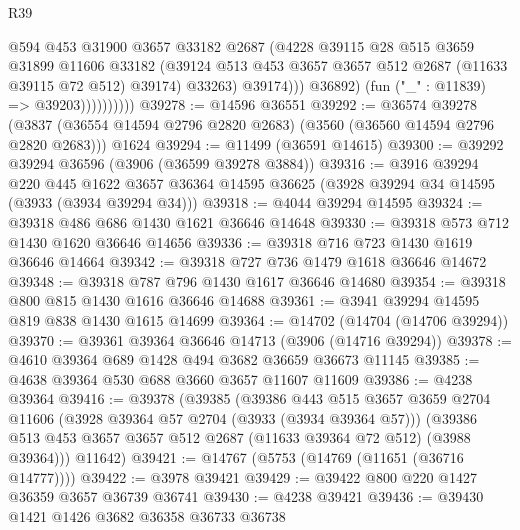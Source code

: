\begin{lexlean}{R39}
\begin{coremodule}
                              @594
                              @453
                              @31900
                              @3657
                              @33182
                              @2687
                              (@4228
                                @39115
                                @28
                                @515
                                @3659
                                @31899
                                @11606
                                @33182
                                (@39124
                                  @513
                                  @453
                                  @3657
                                  @3657
                                  @512
                                  @2687
                                  (@11633 @39115 @72 @512)
                                  @39174)
                                @33263)
                              @39174)))
                        @36892)
                      (fun ("_" : @11839) => @39203))))))))))
@39278 := @14596 @36551
@39292 := @36574
    @39278
    (@3837 (@36554 @14594 @2796 @2820 @2683) (@3560 (@36560 @14594 @2796 @2820 @2683)))
    @1624
@39294 := @11499 (@36591 @14615)
@39300 := @39292 @39294 @36596 (@3906 (@36599 @39278 @3884))
@39316 := @3916
    @39294
    @220
    @445
    @1622
    @3657
    @36364
    @14595
    @36625
    (@3928 @39294 @34 @14595 (@3933 (@3934 @39294 @34)))
@39318 := @4044 @39294 @14595
@39324 := @39318 @486 @686 @1430 @1621 @36646 @14648
@39330 := @39318 @573 @712 @1430 @1620 @36646 @14656
@39336 := @39318 @716 @723 @1430 @1619 @36646 @14664
@39342 := @39318 @727 @736 @1479 @1618 @36646 @14672
@39348 := @39318 @787 @796 @1430 @1617 @36646 @14680
@39354 := @39318 @800 @815 @1430 @1616 @36646 @14688
@39361 := @3941 @39294 @14595 @819 @838 @1430 @1615 @14699
@39364 := @14702 (@14704 (@14706 @39294))
@39370 := @39361 @39364 @36646 @14713 (@3906 (@14716 @39294))
@39378 := @4610 @39364 @689 @1428 @494 @3682 @36659 @36673 @11145
@39385 := @4638 @39364 @530 @688 @3660 @3657 @11607 @11609
@39386 := @4238 @39364
@39416 := @39378
    (@39385
      (@39386
        @443
        @515
        @3657
        @3659
        @2704
        @11606
        (@3928 @39364 @57 @2704 (@3933 (@3934 @39364 @57)))
        (@39386 @513 @453 @3657 @3657 @512 @2687 (@11633 @39364 @72 @512) (@3988 @39364)))
      @11642)
@39421 := @14767 (@5753 (@14769 (@11651 (@36716 @14777))))
@39422 := @3978 @39421
@39429 := @39422 @800 @220 @1427 @36359 @3657 @36739 @36741
@39430 := @4238 @39421
@39436 := @39430 @1421 @1426 @3682 @36358 @36733 @36738

\end{coremodule}
\end{lexlean}
